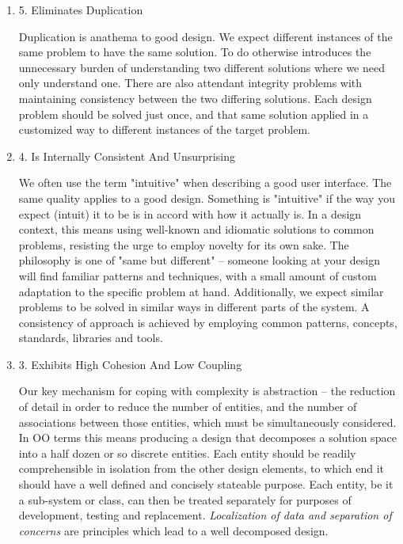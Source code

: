 \documentclass{article}
\begin{document}
\begin{enumerate}
\item 5. Eliminates Duplication
\label{sec:orgheadline242}

Duplication is anathema to good design. We expect different instances of
the same problem to have the same solution. To do otherwise introduces
the unnecessary burden of understanding two different solutions where we
need only understand one. There are also attendant integrity problems
with maintaining consistency between the two differing solutions. Each
design problem should be solved just once, and that same solution
applied in a customized way to different instances of the target
problem.

\item 4. Is Internally Consistent And Unsurprising
\label{sec:orgheadline243}

We often use the term "intuitive" when describing a good user interface.
The same quality applies to a good design. Something is "intuitive" if
the way you expect (intuit) it to be is in accord with how it actually
is. In a design context, this means using well-known and idiomatic
solutions to common problems, resisting the urge to employ novelty for
its own sake. The philosophy is one of "same but different" -- someone
looking at your design will find familiar patterns and techniques, with
a small amount of custom adaptation to the specific problem at hand.
Additionally, we expect similar problems to be solved in similar ways in
different parts of the system. A consistency of approach is achieved by
employing common patterns, concepts, standards, libraries and tools.

\item 3. Exhibits High Cohesion And Low Coupling
\label{sec:orgheadline244}

Our key mechanism for coping with complexity is abstraction -- the
reduction of detail in order to reduce the number of entities, and the
number of associations between those entities, which must be
simultaneously considered. In OO terms this means producing a design
that decomposes a solution space into a half dozen or so discrete
entities. Each entity should be readily comprehensible in isolation from
the other design elements, to which end it should have a well defined
and concisely stateable purpose. Each entity, be it a sub-system or
class, can then be treated separately for purposes of development,
testing and replacement. \emph{Localization of data and separation of
concerns} are principles which lead to a well decomposed design.


\end{enumerate}
\end{document}

